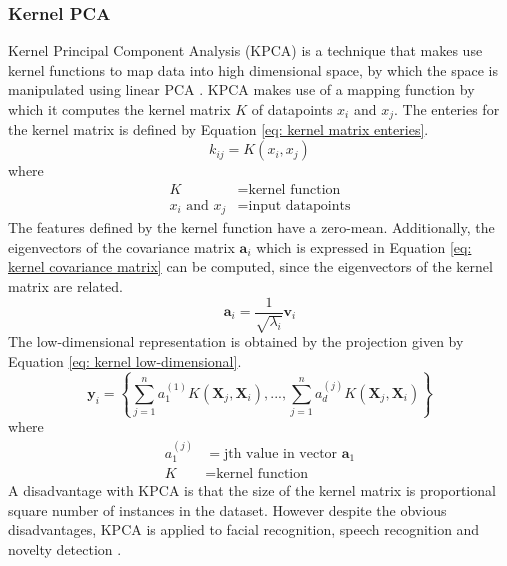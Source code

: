 \documentclass[11pt,twocolumn]{witseiepaper}
\begin{document}
	\subsubsection{Kernel PCA}
	Kernel Principal Component Analysis (KPCA) is a technique that makes use kernel functions to map data into high dimensional space, by which the space is manipulated using linear PCA \cite{Cui2012}. KPCA makes use of a mapping function by which it computes the kernel matrix $K$ of datapoints $x_i$ and $x_j$. The enteries for the kernel matrix is defined by Equation \ref{eq: kernel matrix enteries}.
	\begin{equation}
		k_{ij} = K(x_i, x_j)
		\label{eq: kernel matrix enteries}
	\end{equation}
	where
	\begin{align*}
		K &= \text{kernel function}\\
		x_i \text{ and } x_j &= \text{input datapoints}
	\end{align*}
	The features defined by the kernel function have a zero-mean. Additionally, the eigenvectors of the covariance matrix $\textbf{a}_i$ which is expressed in Equation \ref{eq: kernel covariance matrix} can be computed, since the eigenvectors of the kernel matrix are related.
	\begin{equation}
		\textbf{a}_i = \frac{1}{\sqrt{\lambda_i}} \textbf{v}_i
		\label{eq: kernel covariance matrix}
	\end{equation}
	The low-dimensional representation is obtained by the projection given by Equation \ref{eq: kernel low-dimensional}.
	\begin{equation}
		\textbf{y}_i = \left\{ \sum_{j = 1}^{n}a_1^{(1)}K(\textbf{X}_j, \textbf{X}_i), ... , \sum_{j = 1}^{n}a_d^{(j)}K(\textbf{X}_j, \textbf{X}_i) \right\}
		\label{eq: kernel low-dimensional}
	\end{equation}
	where
	\begin{align*}
		a_1^{(j)} &= \text{jth value in vector }\textbf{a}_1\\
		K &= \text{kernel function}
	\end{align*}
	A disadvantage with KPCA is that the size of the kernel matrix is proportional square number of instances in the dataset. However despite the obvious disadvantages, KPCA is applied to facial recognition, speech recognition and novelty detection \cite{van2009dimensionality}.
	
\end{document}
